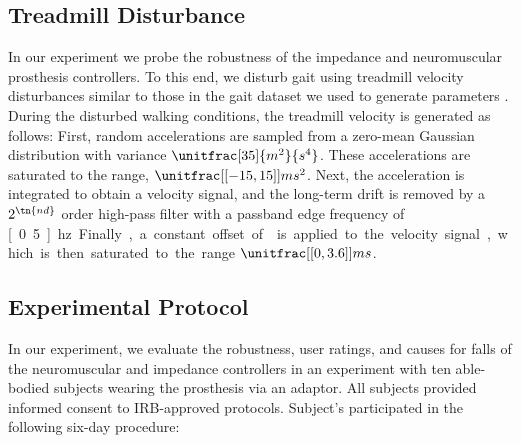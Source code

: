 \subsection{Treadmill Disturbance}\label{sec:treadmill_exp_disturbance}
In our experiment we probe the robustness of the impedance and neuromuscular
prosthesis controllers. To this end, we disturb gait using treadmill velocity
disturbances similar to those in the gait dataset we used to generate parameters
\citep{moore2015elaborate}. During the disturbed walking conditions, the
treadmill velocity is generated as follows: First, random accelerations are
sampled from a zero-mean Gaussian distribution with variance
$\unitfrac[35]{m^2}{s^4}$. These accelerations are saturated to the range,
$\unitfrac[{[-15, 15]}]{m}{s^2}$. Next, the acceleration is integrated to obtain
a velocity signal, and the long-term drift is removed by a $2^\tn{nd}$ order
high-pass filter with a passband edge frequency of \unit[0.5]{hz}. Finally, a
constant offset of  is applied to the velocity signal, which
is then saturated to the range $\unitfrac[{[0, 3.6]}]{m}{s}$.

\subsection{Experimental Protocol}

In our experiment, we evaluate the robustness, user ratings, and causes for
falls of the neuromuscular and impedance controllers in an experiment with ten
able-bodied subjects wearing the prosthesis via an adaptor. All subjects
provided informed consent to IRB-approved protocols. Subject's participated in
the following six-day procedure:


